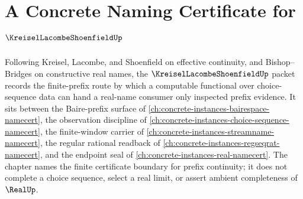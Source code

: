 \chapter{A Concrete Naming Certificate for $\KreiselLacombeShoenfieldUp$}
\label{ch:concrete-instances-kreisel-lacombe-shoenfield-namecert}

Following Kreisel, Lacombe, and Shoenfield on effective continuity, and Bishop--Bridges on constructive real names, the $\KreiselLacombeShoenfieldUp$ packet records the finite-prefix route by which a computable functional over choice-sequence data can hand a real-name consumer only inspected prefix evidence. It sits between the Baire-prefix surface of \autoref{ch:concrete-instances-bairespace-namecert}, the observation discipline of \autoref{ch:concrete-instances-choice-sequence-namecert}, the finite-window carrier of \autoref{ch:concrete-instances-streamname-namecert}, the regular rational readback of \autoref{ch:concrete-instances-regseqrat-namecert}, and the endpoint seal of \autoref{ch:concrete-instances-real-namecert}. The chapter names the finite certificate boundary for prefix continuity; it does not complete a choice sequence, select a real limit, or assert ambient completeness of $\RealUp$.

